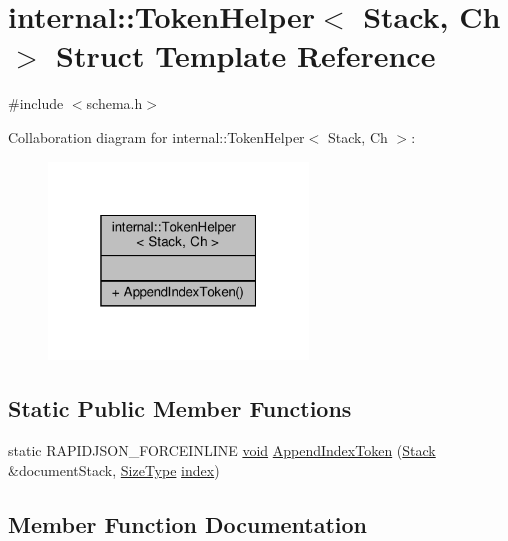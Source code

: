 \hypertarget{structinternal_1_1TokenHelper}{}\section{internal\+:\+:Token\+Helper$<$ Stack, Ch $>$ Struct Template Reference}
\label{structinternal_1_1TokenHelper}


{\ttfamily \#include $<$schema.\+h$>$}



Collaboration diagram for internal\+:\+:Token\+Helper$<$ Stack, Ch $>$\+:
\nopagebreak
\begin{figure}[H]
\begin{center}
\leavevmode
\includegraphics[width=196pt]{structinternal_1_1TokenHelper__coll__graph}
\end{center}
\end{figure}
\subsection*{Static Public Member Functions}
\begin{DoxyCompactItemize}
\item 
static R\+A\+P\+I\+D\+J\+S\+O\+N\+\_\+\+F\+O\+R\+C\+E\+I\+N\+L\+I\+NE \hyperlink{imgui__impl__opengl3__loader_8h_ac668e7cffd9e2e9cfee428b9b2f34fa7}{void} \hyperlink{structinternal_1_1TokenHelper_a7b1864bfe6d4014ba7a5114acb26b3ae}{Append\+Index\+Token} (\hyperlink{classinternal_1_1Stack}{Stack} \&document\+Stack, \hyperlink{rapidjson_8h_a5ed6e6e67250fadbd041127e6386dcb5}{Size\+Type} \hyperlink{imgui__impl__opengl3__loader_8h_a57f14e05b1900f16a2da82ade47d0c6d}{index})
\end{DoxyCompactItemize}


\subsection{Member Function Documentation}
\mbox{\label{structinternal_1_1TokenHelper_a7b1864bfe6d4014ba7a5114acb26b3ae}} 
